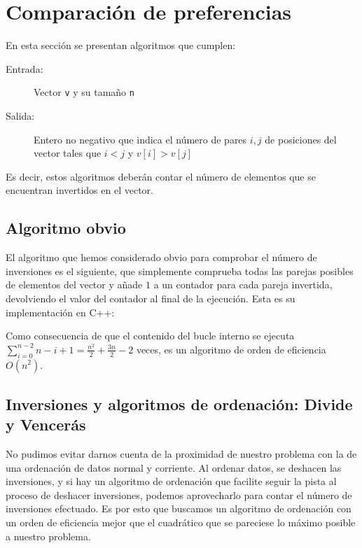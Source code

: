 \section{Comparación de preferencias}

En esta sección se presentan algoritmos que cumplen:
\begin{description}
	\item[Entrada:] Vector \texttt{v} y su tamaño \texttt{n}
	\item[Salida:] Entero no negativo que indica el número de pares $i,j$ de posiciones del vector tales que $i < j$ y $v[i] > v[j]$
\end{description}

Es decir, estos algoritmos deberán contar el número de elementos que se encuentran invertidos en el vector.

\subsection{Algoritmo obvio}

El algoritmo que hemos considerado obvio para comprobar el número de inversiones es el siguiente, que simplemente comprueba todas las parejas posibles de elementos del vector y añade $1$ a un contador para cada pareja invertida, devolviendo el valor del contador al final de la ejecución. Esta es su implementación en C++:



Como consecuencia de que el contenido del bucle interno se ejecuta $\displaystyle \sum_{i=0}^{n-2} n-i+1 = \frac{n^2}{2}+\frac{3n}{2}-2 $ veces, es un algoritmo de orden de eficiencia $O(n^2)$.

\subsection{Inversiones y algoritmos de ordenación: Divide y Vencerás}

No pudimos evitar darnos cuenta de la proximidad de nuestro problema con la de una ordenación de datos normal y corriente. Al ordenar datos, se deshacen las inversiones, y si hay un algoritmo de ordenación que facilite seguir la pista al proceso de deshacer inversiones, podemos aprovecharlo para contar el número de inversiones efectuado.
Es por esto que buscamos un algoritmo de ordenación con un orden de eficiencia mejor que el cuadrático que se pareciese lo máximo posible a nuestro problema. \\

